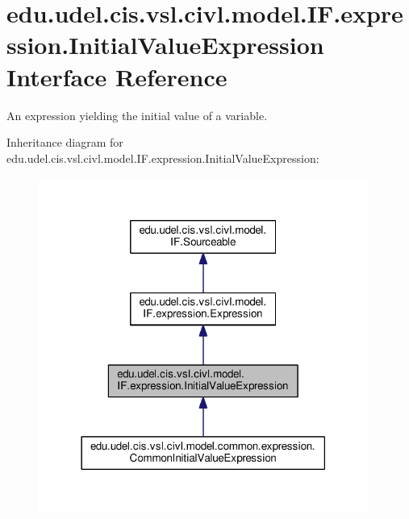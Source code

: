 \hypertarget{interfaceedu_1_1udel_1_1cis_1_1vsl_1_1civl_1_1model_1_1IF_1_1expression_1_1InitialValueExpression}{}\section{edu.\+udel.\+cis.\+vsl.\+civl.\+model.\+I\+F.\+expression.\+Initial\+Value\+Expression Interface Reference}
\label{interfaceedu_1_1udel_1_1cis_1_1vsl_1_1civl_1_1model_1_1IF_1_1expression_1_1InitialValueExpression}


An expression yielding the initial value of a variable.  




Inheritance diagram for edu.\+udel.\+cis.\+vsl.\+civl.\+model.\+I\+F.\+expression.\+Initial\+Value\+Expression\+:
\nopagebreak
\begin{figure}[H]
\begin{center}
\leavevmode
\includegraphics[width=306pt]{interfaceedu_1_1udel_1_1cis_1_1vsl_1_1civl_1_1model_1_1IF_1_1expression_1_1InitialValueExpression__inherit__graph}
\end{center}
\end{figure}



